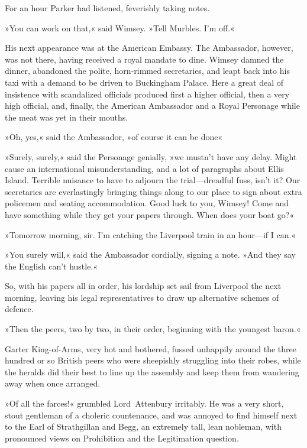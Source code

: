 For an hour Parker had listened, feverishly taking notes.

»You can work on that,« said Wimsey. »Tell Murbles. I'm off.«

His next appearance was at the American Embassy. The Ambassador, however, was not there, having received a royal mandate to dine. Wimsey damned the dinner, abandoned the polite, horn-rimmed secretaries, and leapt back into his taxi with a demand to be driven to Buckingham Palace. Here a great deal of insistence with scandalized officials produced first a higher official, then a very high official, and, finally, the American Ambassador and a Royal Personage while the meat was yet in their mouths.

»Oh, yes,« said the Ambassador, »of course it can be done\longdash«

»Surely, surely,« said the Personage genially, »we mustn't have any delay. Might cause an international misunderstanding, and a lot of paragraphs about Ellis Island. Terrible nuisance to have to adjourn the trial—dreadful fuss, isn't it? Our secretaries are everlastingly bringing things along to our place to sign about extra policemen and seating accommodation. Good luck to you, Wimsey! Come and have something while they get your papers through. When does your boat go?«

»Tomorrow morning, sir. I'm catching the Liverpool train in an hour—if I can.«

»You surely will,« said the Ambassador cordially, signing a note. »And they say the English can't hustle.«

So, with his papers all in order, his lordship set sail from Liverpool the next morning, leaving his legal representatives to draw up alternative schemes of defence. 

\divider

»Then the peers, two by two, in their order, beginning with the youngest baron.«

Garter King-of-Arms, very hot and bothered, fussed unhappily around the three hundred or so British peers who were sheepishly struggling into their robes, while the heralds did their best to line up the assembly and keep them from wandering away when once arranged.

»Of all the farces!« grumbled Lord~Attenbury irritably. He was a very short, stout gentleman of a choleric countenance, and was annoyed to find himself next to the Earl of Strathgillan and Begg, an extremely tall, lean nobleman, with pronounced views on Prohibition and the Legitimation question.

